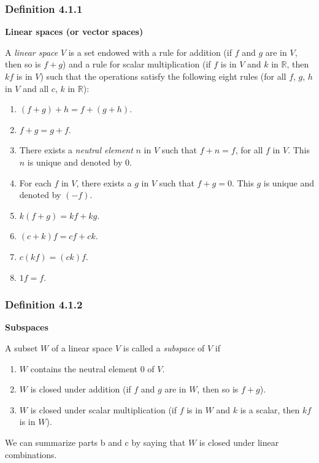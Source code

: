 \documentclass{report}
\begin{document}
\subsubsection*{Definition 4.1.1}
\par\noindent\textbf{Linear spaces (or vector spaces)}
\par\noindent A \textit{linear space} $V$ is a set endowed with a rule for addition (if $f$ and $g$ are in $V$, then so is $f+g$) and a rule for scalar multiplication (if $f$ is in $V$ and $k$ in $\mathbb{R}$, then $kf$ is in $V$) such that the operations satisfy the following eight rules (for all $f$, $g$, $h$ in $V$ and all $c$, $k$ in $\mathbb{R}$):
\renewcommand{\labelenumi}{\textbf{\arabic{enumi}}.}
\begin{enumerate}
\item $(f+g)+h=f+(g+h)$.
\item $f+g=g+f$.
\item There exists a \textit{neutral element} $n$ in $V$ such that $f+n=f$, for all $f$ in $V$. This $n$ is unique and denoted by $0$.
\item For each $f$ in $V$, there exists a $g$ in $V$ such that $f+g=0$. This $g$ is unique and denoted by $(-f)$.
\item $k(f+g)=kf+kg$.
\item $(c+k)f=cf+ck$.
\item $c(kf)=(ck)f$.
\item $1f=f$.
\end{enumerate}
\subsubsection*{Definition 4.1.2}
\par\noindent\textbf{Subspaces}
\par\noindent A subset $W$ of a linear space $V$ is called a \textit{subspace} of $V$ if
\renewcommand{\labelenumi}{\textbf{\alph{enumi}.}}
\begin{enumerate}
\item $W$ contains the neutral element $0$ of $V$.
\item $W$ is closed under addition (if $f$ and $g$ are in $W$, then so is $f+g$).
\item $W$ is closed under scalar multiplication (if $f$ is in $W$ and $k$ is a scalar, then $kf$ is in $W$).
\end{enumerate}
\par\noindent We can summarize parts b and c by saying that $W$ is closed under linear combinations.
\end{document}
